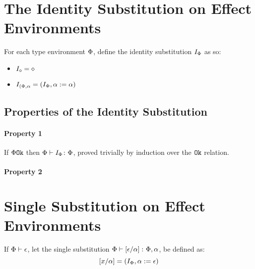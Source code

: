 \documentclass{report}
\begin{document}
\section{The Identity Substitution on Effect Environments}
For each type environment $\P$, define the identity substitution $I_{\P}$ as so:

\begin{itemize}
    \item $I_{\nil} = \nil$
    \item $I_{(\P, \a} = (I_{\P}, \a\setto \a)$
\end{itemize}

\subsection{Properties of the Identity Substitution}
\paragraph{Property 1}
If $\ok{\P}$ then $\typerelation{\P}{I_\P}{\P}$, proved trivially by induction over the $\ok{}$ relation.

\paragraph{Property 2}
\section{Single Substitution on Effect Environments}

If $\wellformed{\P}{\e}$, let the single substitution $\typerelation{\P}{\ssub{\a}{\e}}{\P,\a}$, be defined as:
\begin{equation}
    \ssub{\a}{x} = (I_{\P}, \a\setto \e)
\end{equation}
\end{document}
